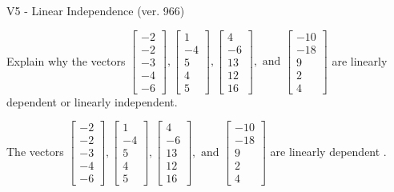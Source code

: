 \begin{exercise}
  \begin{exerciseTitle}V5 - Linear Independence (ver. 966)\end{exerciseTitle}
  \begin{exerciseStatement}
    Explain why the vectors \(\left[\begin{array}{r}
-2 \\
-2 \\
-3 \\
-4 \\
-6
\end{array}\right] , \left[\begin{array}{r}
1 \\
-4 \\
5 \\
4 \\
5
\end{array}\right] , \left[\begin{array}{r}
4 \\
-6 \\
13 \\
12 \\
16
\end{array}\right] , \text{ and } \left[\begin{array}{r}
-10 \\
-18 \\
9 \\
2 \\
4
\end{array}\right]\) are linearly dependent or linearly independent.	


  \end{exerciseStatement}
  \begin{exerciseAnswer}
   The vectors \(\left[\begin{array}{r}
-2 \\
-2 \\
-3 \\
-4 \\
-6
\end{array}\right] , \left[\begin{array}{r}
1 \\
-4 \\
5 \\
4 \\
5
\end{array}\right] , \left[\begin{array}{r}
4 \\
-6 \\
13 \\
12 \\
16
\end{array}\right] , \text{ and } \left[\begin{array}{r}
-10 \\
-18 \\
9 \\
2 \\
4
\end{array}\right]\) are 
  	 linearly dependent  .
  


  \end{exerciseAnswer}
\end{exercise}